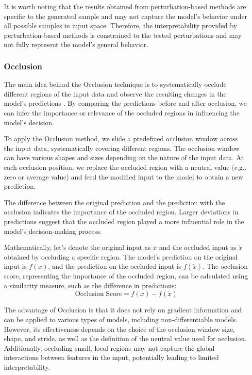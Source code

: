 It is worth noting that the results obtained from perturbation-based methods are specific to the generated sample and may not capture the model's behavior under all possible samples in input space. Therefore, the interpretability provided by perturbation-based methods is constrained to the tested perturbations and may not fully represent the model's general behavior.

\subsubsection{Occlusion}
\label{subsubsec:occlusion}
The main idea behind the Occlusion technique is to systematically occlude different regions of the input data and observe the resulting changes in the model's predictions \cite{deconv}. By comparing the predictions before and after occlusion, we can infer the importance or relevance of the occluded regions in influencing the model's decision.

To apply the Occlusion method, we slide a predefined occlusion window across the input data, systematically covering different regions. The occlusion window can have various shapes and sizes depending on the nature of the input data. At each occlusion position, we replace the occluded region with a neutral value (e.g., zero or average value) and feed the modified input to the model to obtain a new prediction.

The difference between the original prediction and the prediction with the occlusion indicates the importance of the occluded region. Larger deviations in predictions suggest that the occluded region played a more influential role in the model's decision-making process.

Mathematically, let's denote the original input as $x$ and the occluded input as $\tilde{x}$ obtained by occluding a specific region. The model's prediction on the original input is $f(x)$, and the prediction on the occluded input is $f(\tilde{x})$. The occlusion score, representing the importance of the occluded region, can be calculated using a similarity measure, such as the difference in predictions:
\begin{equation}
\text{Occlusion Score} = f(x) - f(\tilde{x})
\end{equation}

The advantage of Occlusion is that it does not rely on gradient information and can be applied to various types of models, including non-differentiable models. However, its effectiveness depends on the choice of the occlusion window size, shape, and stride, as well as the definition of the neutral value used for occlusion. Additionally, occluding small, local regions may not capture the global interactions between features in the input, potentially leading to limited interpretability.